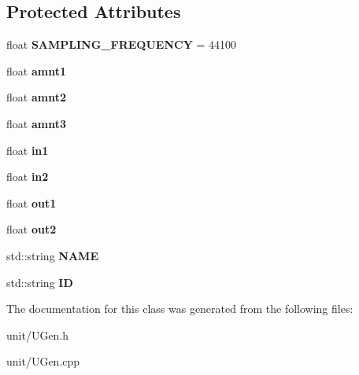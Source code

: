 \subsection*{Protected Attributes}
\begin{DoxyCompactItemize}
\item 
float {\bfseries S\+A\+M\+P\+L\+I\+N\+G\+\_\+\+F\+R\+E\+Q\+U\+E\+N\+CY} = 44100\hypertarget{classunit_1_1UGen_af570ad383b680b2c79209b6ab28d010d}{}\label{classunit_1_1UGen_af570ad383b680b2c79209b6ab28d010d}

\item 
float {\bfseries amnt1}\hypertarget{classunit_1_1UGen_a4691cf88e3711c22617c11fc3ea3848e}{}\label{classunit_1_1UGen_a4691cf88e3711c22617c11fc3ea3848e}

\item 
float {\bfseries amnt2}\hypertarget{classunit_1_1UGen_a5e71a2e764029b4909c7e8535922e4b3}{}\label{classunit_1_1UGen_a5e71a2e764029b4909c7e8535922e4b3}

\item 
float {\bfseries amnt3}\hypertarget{classunit_1_1UGen_a14ebb8261a700f961c2d7808609470fe}{}\label{classunit_1_1UGen_a14ebb8261a700f961c2d7808609470fe}

\item 
float {\bfseries in1}\hypertarget{classunit_1_1UGen_aaf1873ae9668c6f1b37cae635bd40037}{}\label{classunit_1_1UGen_aaf1873ae9668c6f1b37cae635bd40037}

\item 
float {\bfseries in2}\hypertarget{classunit_1_1UGen_aed559bb431c46fe308560bd81756d169}{}\label{classunit_1_1UGen_aed559bb431c46fe308560bd81756d169}

\item 
float {\bfseries out1}\hypertarget{classunit_1_1UGen_a90ba3b9008a6d8386035db3dee502217}{}\label{classunit_1_1UGen_a90ba3b9008a6d8386035db3dee502217}

\item 
float {\bfseries out2}\hypertarget{classunit_1_1UGen_a779961bf3971a9f4c85d292dbb6d6d78}{}\label{classunit_1_1UGen_a779961bf3971a9f4c85d292dbb6d6d78}

\item 
std\+::string {\bfseries N\+A\+ME}\hypertarget{classunit_1_1UGen_ae468f7e763da88da4389b8bdbc306459}{}\label{classunit_1_1UGen_ae468f7e763da88da4389b8bdbc306459}

\item 
std\+::string {\bfseries ID}\hypertarget{classunit_1_1UGen_ab8d5acd179e175cc787ac43a49b68c29}{}\label{classunit_1_1UGen_ab8d5acd179e175cc787ac43a49b68c29}

\end{DoxyCompactItemize}


The documentation for this class was generated from the following files\+:\begin{DoxyCompactItemize}
\item 
unit/U\+Gen.\+h\item 
unit/U\+Gen.\+cpp\end{DoxyCompactItemize}

